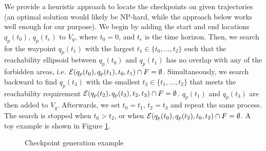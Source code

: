 \documentclass[journal]{IEEEtran}  %
\begin{document}
We provide a heuristic approach to locate the checkpoints on given trajectories (an optimal solution would likely be NP-hard, while the approach below works well enough for our purpose). 
 We begin by adding the start and end locations $q_{p}(t_{0})$, $q_{p}(t_{e})$ to $V_{q}$, where $t_{0}=0$, and $t_{e}$ is the time horizon. Then, we search for the waypoint $q_{p}(t_{1})$ with the largest $t_{1} \in \{t_{0}, \dots ,t_{2}\}$ such that the reachability ellipsoid between $q_{p}(t_{0})$ and $q_{p}(t_{1})$ has no overlap with any of the forbidden areas, i.e. $\mathcal{E}(q_{p}(t_{0}),q_{p}(t_{1}), t_{0},t_{1})\cap F = \emptyset$. Simultaneously, we search backward to find $q_{p}(t_{3})$ with the smallest $t_{3}\in \{t_{1}, \dots ,t_{2}\} $ that meets the reachability requirement $\mathcal{E}(q_{p}(t_{2}),q_{p}(t_{3}),t_{2},t_{3}) \cap F = \emptyset$. $q_{p}(t_{1})$ and $q_{p}(t_{3})$ are then added to $V_{q}$. Afterwards, we set $t_{0}=t_{1}$, $t_{2}=t_{3}$ and repeat the same process. The search is stopped when $t_{0}>t_{2}$, or when $\mathcal{E}(q_{p}(t_{0}),q_{p}(t_{2}),t_{0},t_{2}) \cap F = \emptyset$. A toy example is shown in Figure \ref{fig:checkpoint-generate}. 

\begin{figure}
	\centering
    \caption{Checkpoint generation example}\label{fig:checkpoint-generate}
\end{figure}
\end{document}
